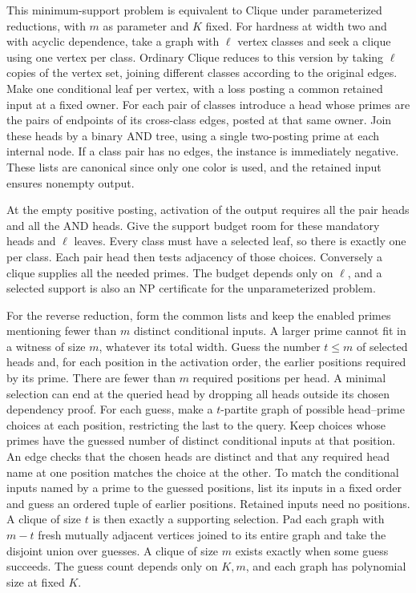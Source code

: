 This minimum-support problem is equivalent
to Clique under parameterized reductions, with $m$
as parameter and $K$ fixed. For hardness at width
two and with acyclic dependence, take a graph with
$\ell$ vertex classes and seek a
clique using one vertex per class. Ordinary Clique
reduces to this version by taking $\ell$ copies
of the vertex set, joining different classes
according to the original edges. Make one
conditional leaf per vertex, with a loss posting a
common retained input at a fixed owner. For each
pair of classes introduce a head whose primes are
the pairs of endpoints of its cross-class edges,
posted at that same owner. Join these heads by a
binary AND tree, using a single two-posting prime
at each internal node. If a class pair has no
edges, the instance is immediately negative.
These lists are canonical since only one color is
used, and the retained input ensures nonempty
output.

At the empty positive posting, activation of the
output requires all the pair heads and all the
AND heads. Give the support budget room for these
mandatory heads and $\ell$ leaves. Every class
must have a selected leaf, so there is exactly
one per class. Each pair head then tests adjacency
of those choices. Conversely a clique supplies
all the needed primes. The budget depends only
on $\ell$, and a selected support is also an NP
certificate for the unparameterized problem.

For the reverse reduction, form the common lists
and keep the enabled primes mentioning fewer than
$m$ distinct conditional inputs. A larger prime
cannot fit in a witness of size $m$, whatever its
total width. Guess the number $t\le m$ of
selected heads and, for each position in the
activation order, the earlier positions required by its
prime. There are fewer than $m$ required positions
per head. A minimal selection can end at the
queried head by dropping all heads outside its
chosen dependency proof. For each guess, make a
$t$-partite graph of possible head--prime choices
at each position, restricting the last to the query.
Keep choices whose primes have the guessed number
of distinct conditional inputs at that position.
An edge checks that the chosen heads are distinct
and that any required head name at one position
matches the choice at the other. To match the
conditional inputs named by a prime to the
guessed positions, list its inputs in a fixed
order and guess an ordered tuple of earlier
positions. Retained inputs need no positions.
A clique of size $t$ is then exactly
a supporting selection. Pad each graph with
$m-t$ fresh mutually adjacent vertices joined to
its entire graph and take the disjoint union over
guesses. A clique of size $m$ exists exactly when
some guess succeeds. The guess count depends
only on $K,m$, and each graph has polynomial size
at fixed $K$.

